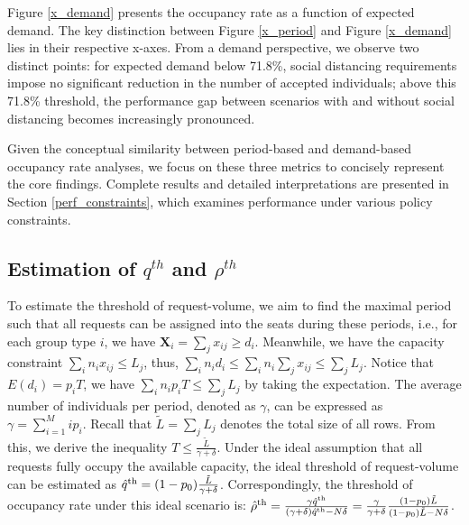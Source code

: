 


Figure \ref{x_demand} presents the occupancy rate as a function of expected demand. The key distinction between Figure \ref{x_period} and Figure \ref{x_demand} lies in their respective x-axes. From a demand perspective, we observe two distinct points: for expected demand below 71.8\%, social distancing requirements impose no significant reduction in the number of accepted individuals; above this 71.8\% threshold, the performance gap between scenarios with and without social distancing becomes increasingly pronounced.

Given the conceptual similarity between period-based and demand-based occupancy rate analyses, we focus on these three metrics to concisely represent the core findings. Complete results and detailed interpretations are presented in Section \ref{perf_constraints}, which examines performance under various policy constraints.


\subsection{Estimation of $q^{th}$ and $\rho^{th}$}
To estimate the threshold of request-volume, we aim to find the maximal period such that all requests can be assigned into the seats during these periods, i.e., for each group type $i$, we have $\bm{X}_{i} = \sum_{j} x_{ij} \geq d_i$. Meanwhile, we have the capacity constraint $\sum_{i} n_{i} x_{ij} \leq L_j$, thus, $\sum_{i} n_i d_i \leq \sum_{i} n_i \sum_{j} x_{ij} \leq \sum_{j} L_{j}$. Notice that $E(d_i) = p_i T$, we have $\sum_{i} n_i p_i T \leq \sum_{j} L_{j}$ by taking the expectation. The average number of individuals per period, denoted as $\gamma$, can be expressed as $\gamma = \sum_{i=1}^{M} i p_i$. Recall that $\tilde{L} = \sum_{j} L_{j}$ denotes the total size of all rows. From this, we derive the inequality $T \leq \frac{\tilde{L}}{\gamma + \delta}$. Under the ideal assumption that all requests fully occupy the available capacity, the ideal threshold of request-volume can be estimated as $\hat{q}^{\textup{th}} = (1-p_0) \frac{\tilde{L}}{\gamma + \delta}$. Correspondingly, the threshold of occupancy rate under this ideal scenario is: 
$\hat{\rho}^{\textup{th}}= \frac{\gamma \hat{q}^{\textup{th}}}{(\gamma+ \delta)\hat{q}^{\textup{th}} - N \delta} = \frac{\gamma}{\gamma +\delta} \frac{(1-p_0) \tilde{L}}{(1-p_0) \tilde{L}-N \delta}$. 


